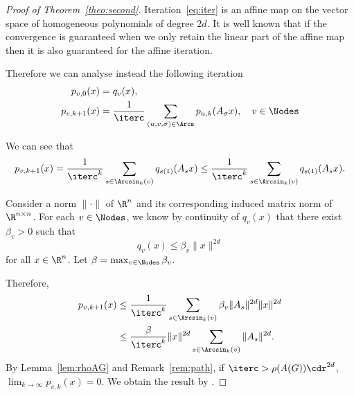 \begin{proof}[Proof of Theorem~\ref{theo:second}]
  Iteration~\ref{eq:iter} is an affine map on the vector space of
  homogeneous polynomials of degree $2d$.  It is well known that
  if the convergence is guaranteed when we only retain the linear
  part of the affine map then it is also guaranteed for the affine
  iteration.

  Therefore we can analyse instead the following iteration
  \begin{align*}
    p_{v,0}(x) & = q_v(x),\\
    p_{v,k+1}(x) & = \frac{1}{\iterc} %
    \sum_{(u,v,\sigma) \in \Arcs} p_{u,k}(A_\sigma x), \quad  v \in \Nodes
  \end{align*}

  We can see that
  \begin{equation}
    p_{v,k+1}(x) = \frac{1}{\iterc^k}\sum_{s \in \Arcsin_k(v)} q_{s(1)}(A_s x)\\
    \leq \frac{1}{\iterc^k}\sum_{s \in \Arcsin_k(v)} q_{s(1)}(A_s x).
  \end{equation}

  Consider a norm $\|\cdot\|$ of $\R^n$ and its corresponding induced matrix norm of $\R^{n \times n}$.
  For each $v \in \Nodes$, we know by continuity of $q_v(x)$ that there exist $\beta_v > 0$ such that
  \[ q_v(x) \leq \beta_v\|x\|^{2d} \]
  for all $x \in \R^n$.
  Let $\beta = \max_{v \in \Nodes} \beta_v$.

  Therefore,
  \begin{align*}
    p_{v,k+1}(x)
    & \leq \frac{1}{\iterc^k}\sum_{s \in \Arcsin_k(v)} \beta_v \|A_s\|^{2d} \|x\|^{2d}\\
    & \leq \frac{\beta}{\iterc^k} \|x\|^{2d} \sum_{s \in \Arcsin_k(v)} \|A_s\|^{2d}.
  \end{align*}
  By Lemma~\ref{lem:rhoAG} and Remark~\ref{rem:path}, if
  $\iterc > \rho(A(G))\cdr^{2d}$, $\lim_{k \to \infty} p_{v,k}(x) = 0$.
  We obtain the result by .
\end{proof}
